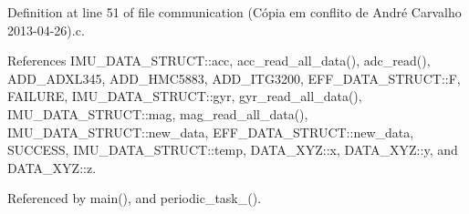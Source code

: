 Definition at line 51 of file communication (\-Cópia em conflito de André Carvalho 2013-\/04-\/26).\-c.



References I\-M\-U\-\_\-\-D\-A\-T\-A\-\_\-\-S\-T\-R\-U\-C\-T\-::acc, acc\-\_\-read\-\_\-all\-\_\-data(), adc\-\_\-read(), A\-D\-D\-\_\-\-A\-D\-X\-L345, A\-D\-D\-\_\-\-H\-M\-C5883, A\-D\-D\-\_\-\-I\-T\-G3200, E\-F\-F\-\_\-\-D\-A\-T\-A\-\_\-\-S\-T\-R\-U\-C\-T\-::\-F, F\-A\-I\-L\-U\-R\-E, I\-M\-U\-\_\-\-D\-A\-T\-A\-\_\-\-S\-T\-R\-U\-C\-T\-::gyr, gyr\-\_\-read\-\_\-all\-\_\-data(), I\-M\-U\-\_\-\-D\-A\-T\-A\-\_\-\-S\-T\-R\-U\-C\-T\-::mag, mag\-\_\-read\-\_\-all\-\_\-data(), I\-M\-U\-\_\-\-D\-A\-T\-A\-\_\-\-S\-T\-R\-U\-C\-T\-::new\-\_\-data, E\-F\-F\-\_\-\-D\-A\-T\-A\-\_\-\-S\-T\-R\-U\-C\-T\-::new\-\_\-data, S\-U\-C\-C\-E\-S\-S, I\-M\-U\-\_\-\-D\-A\-T\-A\-\_\-\-S\-T\-R\-U\-C\-T\-::temp, D\-A\-T\-A\-\_\-\-X\-Y\-Z\-::x, D\-A\-T\-A\-\_\-\-X\-Y\-Z\-::y, and D\-A\-T\-A\-\_\-\-X\-Y\-Z\-::z.



Referenced by main(), and periodic\-\_\-task\-\_().


